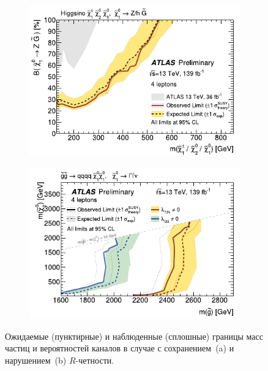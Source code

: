 \documentclass[a4paper, 10pt, twocolumn]{article}
\begin{document}
\begin{figure}[p]%
	\centering
	\begin{subfigure}{.9\linewidth}
		\includegraphics[width=\linewidth]{figures/4lepton-limits-higgsino}
		\caption{}
		\label{fig:4l-limits:higgsino}
	\end{subfigure}
	\begin{subfigure}{.9\linewidth}
		\includegraphics[width=\linewidth]{figures/4lepton-limits-gluino}
		\caption{}
		\label{fig:4l-limits:gluino}
	\end{subfigure}
	\caption{Ожидаемые (пунктирные) и наблюденные (сплошные) границы масс 
	частиц и вероятностей каналов в случае с сохранением~(a) 
	и нарушением~(b) $R$-четности.}
	\label{fig:4l-limits}
\end{figure}%
\end{document}
